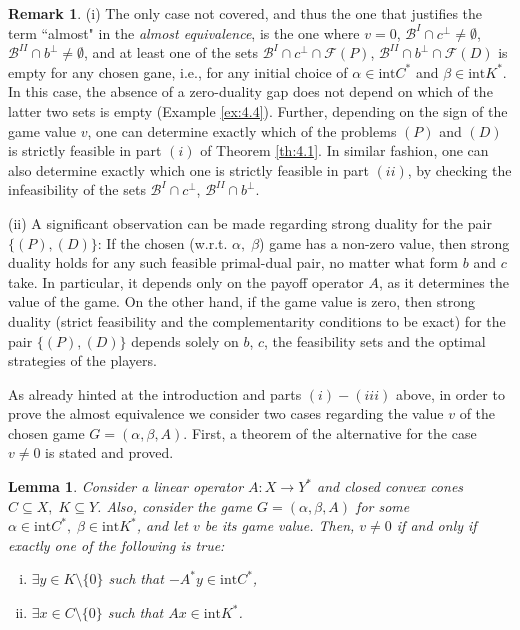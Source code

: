 \documentclass[11pt, twoside]{article}
\numberwithin{equation}{section}
\newtheorem{lemma}{Lemma}[section]
\theoremstyle{definition}
\newtheorem{remark}{Remark}[section]
\begin{document}
\begin{remark}\label{rem:4} (i) The only case not covered, and thus the one that justifies the term ``almost" in the \textit{almost equivalence}, is the one where $v=0$, $\mathcal{B}^{I}\cap c^{\perp}\neq\emptyset$, $\mathcal{B}^{II}\cap b^{\perp}\neq\emptyset$, and at least one of the sets $\mathcal{B}^{I}\cap c^{\perp}\cap\mathcal{F}(P)$, $\mathcal{B}^{II}\cap b^{\perp}\cap\mathcal{F}(D)$ is empty for any chosen gane, i.e., for any initial choice of $\alpha\in\text{int}C^*$ and $\beta\in\text{int}K^*$. In this case, the absence of a zero-duality gap does not depend on which of the latter two sets is empty (Example \ref{ex:4.4}). Further, depending on the sign of the game value $v$, one can determine exactly which of the problems \hyperlink{primal}{$(P)$} and \hyperlink{dual}{$(D)$} is strictly feasible in part $(i)$ of Theorem \ref{th:4.1}. In similar fashion, one can also determine exactly which one is strictly feasible in part $(ii)$, by checking the infeasibility of the sets $\mathcal{B}^{I}\cap c^{\perp}$, $\mathcal{B}^{II}\cap b^{\perp}$.\par
(ii) A significant observation can be made regarding strong duality for the pair \hyperlink{primaldual}{$\{(P),(D)\}$}: If the chosen (w.r.t. $\alpha,\;\beta$) game has a non-zero value, then strong duality holds for any such feasible primal-dual pair, no matter what form $b$ and $c$ take. In particular, it depends only on the payoff operator $A$, as it determines the value of the game. On the other hand, if the game value is zero, then strong duality (strict feasibility and the complementarity conditions to be exact) for the pair \hyperlink{primaldual}{$\{(P),(D)\}$} depends solely on $b$, $c$, the feasibility sets and the optimal strategies of the players.
\end{remark}

As already hinted at the introduction and parts $(i)-(iii)$ above, in order to prove the almost equivalence we consider two cases regarding the value $v$ of the chosen game $G=(\alpha,\beta,A)$. First, a theorem of the alternative for the case $v\neq 0$ is stated and proved.

\begin{lemma}\label{lem:4.2}
    Consider a linear operator $A:X\rightarrow Y^*$ and closed convex cones $C\subseteq X,\;K\subseteq Y$. Also, consider the game $G=(\alpha,\beta,A)$ for some $\alpha\in \text{int} C^*,\;\beta\in\text{int}K^*$, and let $v$ be its game value. Then, $v\neq0$ if and only if exactly one of the following is true:\vspace{-0.3cm}
    \begin{enumerate}[(i)]
        \item $\exists y\in K\setminus\{0\}$ such that $-A^*y\in \text{int}C^*$,\vspace{-0.2cm}
        \item $\exists x\in C\setminus\{0\}$ such that $Ax\in \text{int}K^*$.\quad
    \end{enumerate}
\end{lemma}
\end{document}
